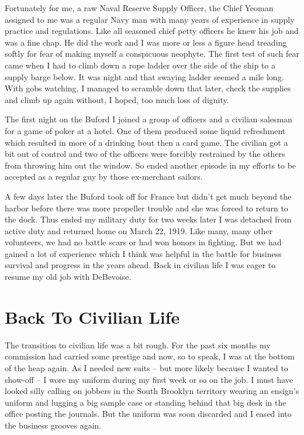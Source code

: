 \documentclass[12pt]{book}              %
\begin{document}
Fortunately for me, a raw Naval Reserve Supply Officer, the Chief Yeoman assigned to me was a regular Navy man with many years of experience in supply practice and regulations. Like all seasoned chief petty officers he knew his job and was a fine chap. He did the work and I was more or less a figure head treading softly for fear of making myself a conspicuous neophyte. The first test of such fear came when I had to climb down a rope ladder over the side of the ship to a supply barge below. It was night and that swaying ladder seemed a mile long. With gobs watching, I managed to scramble down that later, check the supplies and climb up again without, I hoped, too much loss of dignity. 

The first night on the Buford I joined a group of officers and a civilian salesman for a game of poker at a hotel. One of them produced some liquid refreshment which resulted in more of a drinking bout then a card game. The civilian got a bit out of control and two of the officers were forcibly restrained by the others from throwing him out the window. So ended another episode in my efforts to be accepted as a regular guy by those ex-merchant sailors. 

A few days later the Buford took off for France but didn't get much beyond the harbor before there was more propeller trouble and she was forced to return to the dock. Thus ended my military duty for two weeks later I was detached from active duty and returned home on March 22, 1919. Like many, many other volunteers, we had no battle scars or had won honors in fighting. But we had gained a lot of experience which I think was helpful in the battle for business survival and progress in the years ahead. Back in civilian life I was eager to resume my old job with DeBevoise. 

\chapter{Back To Civilian Life}

The transition to civilian life was a bit rough. For the past six months my commission had carried some prestige and now, so to speak, I was at the bottom of the heap again. As I needed new suits -- but more likely because I wanted to show-off -- I wore my uniform during my first week or so on the job. I must have looked silly calling on jobbers in the South Brooklyn territory wearing an ensign's uniform and lugging a big sample case or standing behind that big desk in the office posting the journals. But the uniform was soon discarded and I eased into the business grooves again.
\end{document}
